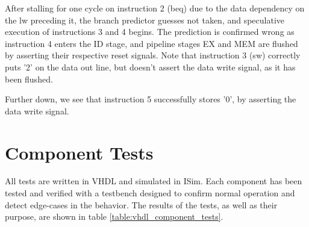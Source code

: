 After stalling for one cycle on instruction 2 (beq) due to the data dependency on the lw preceding it, the branch predictor guesses not taken, and speculative execution of instructions 3 and 4 begins.
The prediction is confirmed wrong as instruction 4 enters the ID stage, and pipeline stages EX and MEM are flushed by asserting their respective reset signals.
Note that instruction 3 (sw) correctly puts '2' on the data out line, but doesn't assert the data write signal, as it has been flushed.

Further down, we see that instruction 5 successfully stores '0', by asserting the data write signal.

\section{Component Tests}

All tests are written in VHDL and simulated in ISim.
Each component has been tested and verified with a testbench designed to confirm normal operation and detect edge-cases in the behavior.
The results of the tests, as well as their purpose, are shown in table \ref{table:vhdl_component_tests}.


